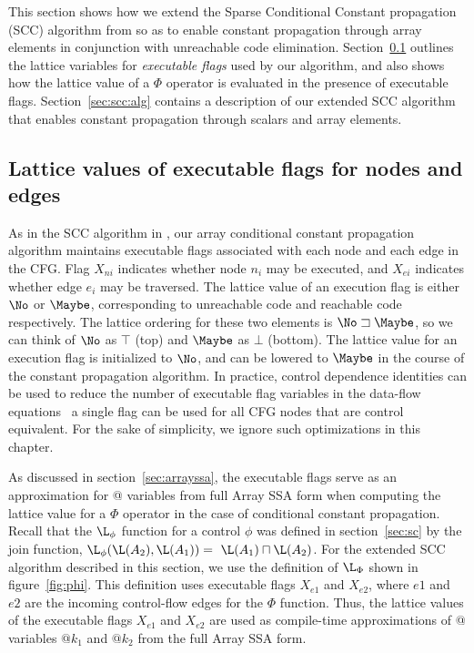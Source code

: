 This section shows how we extend the Sparse Conditional
Constant propagation (SCC) algorithm from \cite{WZ91} so as to enable
constant propagation through array elements in conjunction with 
unreachable code elimination.
Section~\ref{sec:scc:flags} outlines the lattice variables
for {\it executable flags} used by our algorithm, and also shows
how the lattice value of a $\Phi$ operator is evaluated in the
presence of executable flags.
Section~\ref{sec:scc:alg} contains a description of our extended
SCC algorithm that enables constant propagation through scalars and
array elements.

\subsection{Lattice values of executable flags for nodes and edges}\label{sec:scc:flags}


As in the SCC algorithm in \cite{WZ91},
our array conditional constant propagation
algorithm maintains executable flags associated with each node and
each edge in the CFG. Flag $X_{ni}$ indicates
whether node $n_i$ may be executed, and $X_{ei}$ indicates whether
edge $e_i$ may be traversed.  The lattice value of an execution
flag is either $\No$ or $\Maybe$, corresponding to
unreachable code and reachable code respectively.
The lattice ordering for these two elements is $\No \sqsupset \Maybe$,
so we can think of $\No$ as $\top$ (top) and $\Maybe$ as $\bot$ (bottom).
The lattice
value for an
execution flag is initialized to $\No$, and can be lowered to $\Maybe$
in the course of the constant propagation algorithm.
In practice, control dependence identities can be used to reduce the number of executable flag variables in the data-flow equations \eg\ a single flag can be used for all CFG nodes that are control equivalent.  For the sake of
simplicity, we ignore such optimizations in this chapter.


As discussed in section~\ref{sec:arrayssa}, 
the executable flags serve as an approximation for @ variables
from full Array SSA form when computing the lattice value
for a $\Phi$ operator in the case of conditional constant propagation.
Recall that the
$\L_{\phi}$ function for a control $\phi$
was defined in section~\ref{sec:sc} by the  join function,
$\L_{\phi}(\L(A_2),\L(A_1)) =\ \L(A_1) \sqcap
\L(A_2)$.  For the extended SCC algorithm described in this section,
we use the definition of $\L_{\Phi}$ shown
in figure~\ref{fig:phi}.  This definition uses executable flags
$X_{e1}$ and $X_{e2}$, where $e1$ and $e2$ are the incoming control-flow edges for the $\Phi$ function.  Thus, the lattice values of the
executable flags $X_{e1}$ and $X_{e2}$
are used as compile-time approximations of 
@ variables $@k_1$ and $@k_2$ from the
full Array SSA form.


